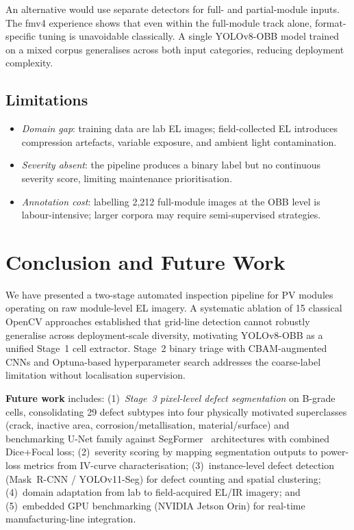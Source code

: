 \documentclass[conference]{IEEEtran}
\begin{document}
An alternative would use separate detectors for full- and
partial-module inputs. The fmv4 experience shows that even
within the full-module track alone, format-specific tuning
is unavoidable classically. A single YOLOv8-OBB model
trained on a mixed corpus generalises across both input
categories, reducing deployment complexity.

\subsection{Limitations}

\begin{itemize}
  \item \textit{Domain gap}: training data are lab EL images;
        field-collected EL introduces compression artefacts,
        variable exposure, and ambient light contamination.
  \item \textit{Severity absent}: the pipeline produces a
        binary label but no continuous severity score,
        limiting maintenance prioritisation.
  \item \textit{Annotation cost}: labelling 2{,}212
        full-module images at the OBB level is labour-intensive;
        larger corpora may require semi-supervised strategies.
\end{itemize}

\section{Conclusion and Future Work}

We have presented a two-stage automated inspection pipeline
for PV modules operating on raw module-level EL imagery.
A systematic ablation of 15 classical OpenCV approaches
established that grid-line detection cannot robustly
generalise across deployment-scale diversity, motivating
YOLOv8-OBB as a unified Stage~1 cell extractor.
Stage~2 binary triage with CBAM-augmented CNNs and
Optuna-based hyperparameter search addresses the coarse-label
limitation without localisation supervision.

\textbf{Future work} includes:
(1)~\textit{Stage~3 pixel-level defect segmentation} on
B-grade cells, consolidating 29 defect subtypes into four
physically motivated superclasses (crack, inactive area,
corrosion/metallisation, material/surface) and benchmarking
U-Net family against SegFormer~\cite{xie2021} architectures
with combined Dice+Focal loss;
(2)~severity scoring by mapping segmentation outputs to
power-loss metrics from IV-curve characterisation;
(3)~instance-level defect detection (Mask~R-CNN /
YOLOv11-Seg) for defect counting and spatial clustering;
(4)~domain adaptation from lab to field-acquired EL/IR
imagery; and
(5)~embedded GPU benchmarking (NVIDIA Jetson Orin) for
real-time manufacturing-line integration.
\end{document}
